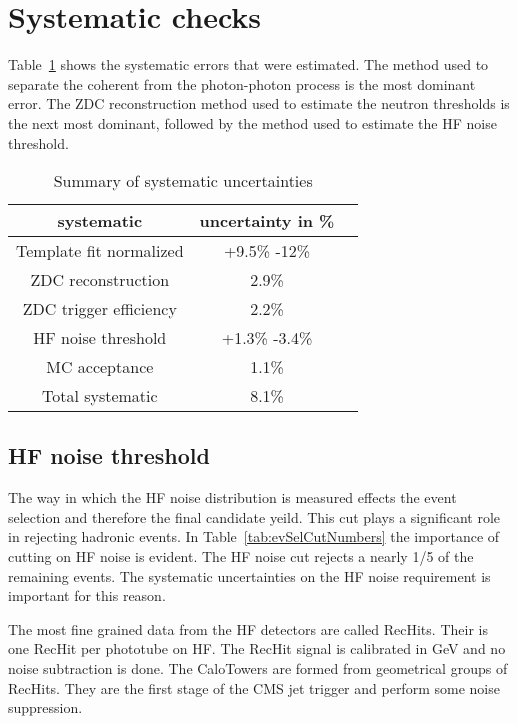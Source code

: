   \section{\label{sec:sysCheck} Systematic checks}
    
    Table~\ref{tab:sumsyst} shows the systematic errors that were estimated.
    The method used to separate the coherent from the photon-photon process 
     is the most dominant error.
    The ZDC reconstruction method used to estimate the neutron thresholds 
      is the next most dominant, followed by the method used to estimate
      the HF noise threshold. 
    
    \begin{table}[!Hhtb]
      \begin{center}
        \begin{tabular}{|c|c|c|}
          \hline
          systematic & uncertainty in \%  \\ \hline
          Template fit normalized & +9.5\% -12\%    \\ \hline
          ZDC reconstruction  & 2.9\%  \\ \hline
          ZDC trigger efficiency & 2.2\%    \\ \hline
          HF noise threshold & +1.3\% -3.4\%    \\ \hline 
          MC acceptance & 1.1\%    \\ \hline
          \hline \hline
          Total systematic & 8.1\%    \\ \hline
        \end{tabular}
        \caption{Summary of systematic uncertainties}
        \label{tab:sumsyst}
      \end{center}
    \end{table}

    \subsection{HF noise threshold}
      The way in which the HF noise distribution is measured effects the event 
        selection and therefore the final candidate yeild.
      This cut plays a significant role in rejecting hadronic events.
      In Table~\ref{tab:evSelCutNumbers} the importance of cutting on HF noise
        is evident. 
      The HF noise cut rejects a nearly 1/5 of the remaining events. 
      The systematic uncertainties on the HF noise requirement is important for
        this reason.
     
      The most fine grained data from the HF detectors are called RecHits. 
      Their is one RecHit per phototube on HF. 
      The RecHit signal is calibrated in GeV and no noise subtraction is done. 
      The CaloTowers are formed from geometrical groups of RecHits. 
      They are the first stage of the CMS jet trigger and perform some noise 
        suppression.

